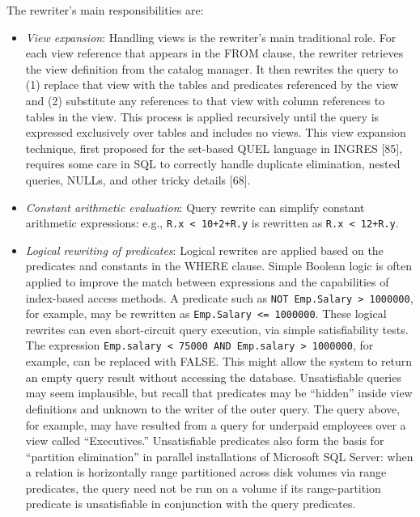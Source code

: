 \documentclass[b5paper,11pt,twoside,openright]{book}
\begin{document}
The rewriter's main responsibilities are:

\begin{itemize}
\item
  \emph{View expansion}: Handling views is the rewriter's main
  traditional role. For each view reference that appears in the FROM
  clause, the rewriter retrieves the view definition from the catalog
  manager. It then rewrites the query to (1) replace that view with the
  tables and predicates referenced by the view and (2) substitute any
  references to that view with column references to tables in the view.
  This process is applied recursively until the query is expressed
  exclusively over tables and includes no views. This view expansion
  technique, first proposed for the set-based QUEL language in INGRES
  {[}85{]}, requires some care in SQL to correctly handle duplicate
  elimination, nested queries, NULLs, and other tricky details {[}68{]}.
\item
  \emph{Constant arithmetic evaluation}: Query rewrite can simplify
constant arithmetic expressions: e.g., \texttt{R.x < 10+2+R.y} is
rewritten as \texttt{R.x < 12+R.y}.
\item
  \emph{Logical rewriting of predicates}: Logical rewrites are applied
  based on the predicates and constants in the WHERE clause. Simple
  Boolean logic is often applied to improve the match between
  expressions and the capabilities of index-based access methods. A
  predicate such as \texttt{NOT Emp.Salary > 1000000}, for example,
  may be rewritten as \texttt{Emp.Salary <= 1000000}. These logical
  rewrites can even short-circuit query execution, via simple
		satisfiability tests. The expression \texttt{Emp.salary \textless{} 75000 AND
		Emp.salary \textgreater{} 1000000}, for example, can be replaced with
  FALSE. This might allow the system to return an empty query result
  without accessing the database. Unsatisfiable queries may seem
  implausible, but recall that predicates may be ``hidden'' inside view
  definitions and unknown to the writer of the outer query. The query
  above, for example, may have resulted from a query for underpaid
  employees over a view called ``Executives.'' Unsatisfiable predicates
  also form the basis for ``partition elimination'' in parallel
  installations of Microsoft SQL Server: when a relation is horizontally
  range partitioned across disk volumes via range predicates, the query
  need not be run on a volume if its range-partition predicate is
  unsatisfiable in conjunction with the query predicates.


\end{itemize}
\end{document}
